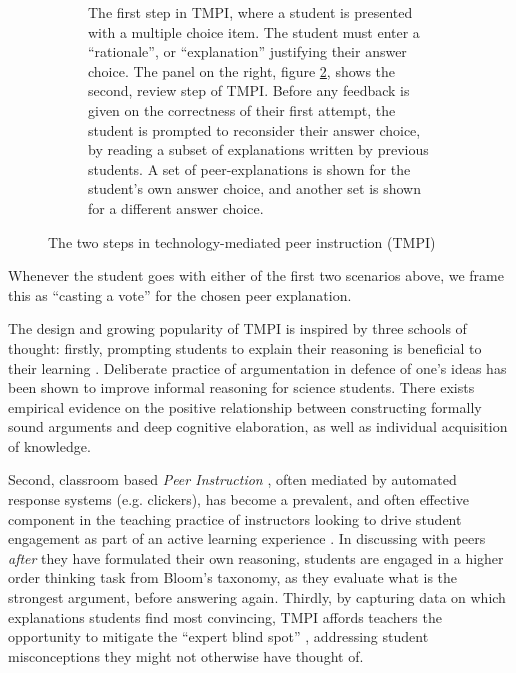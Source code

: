 \documentclass[notitlepage,12pt]{jedm}
\begin{document}
\begin{figure}[H]
	\begin{subfigure}[b]{0.4\textwidth}
		\def\svgscale{0.50}
		
		\caption{
			The first step in TMPI, where a student is presented with a 
			multiple choice item. The student must enter a ``rationale'', or 
			``explanation'' justifying their answer choice.
			\newline
			\newline
			The panel on the right, figure \protect\ref{fig:question_review}, 
			shows the second, review step of TMPI.
			Before any feedback is given on the correctness of their first 
			attempt, the student is prompted to reconsider their answer choice, 
			by reading a subset of explanations written by previous students.
			A set of peer-explanations is shown for the student's own answer 
			choice, and another set is shown for a different answer choice. 
		}
		\label{fig:question_start}
	\end{subfigure}
	\qquad
	\begin{subfigure}[b]{0.6\textwidth}
		\def\svgscale{0.50}
		
		\caption{}
		\label{fig:question_review}
	\end{subfigure}
	\caption{The two steps in technology-mediated peer 
		instruction (TMPI)}
	\label{fig:tmpi}
\end{figure}


Whenever the student goes with either of the first two scenarios above, we 
frame this as ``casting a vote'' for the chosen peer explanation.

The design and growing popularity of TMPI is inspired by three schools of 
thought: firstly, prompting students to explain their reasoning is beneficial 
to their learning \cite{chi_eliciting_1994}. 
Deliberate practice of argumentation in defence of one's ideas has been shown 
to improve informal reasoning for science students\cite{venville_impact_2010}.
There exists empirical evidence on the positive relationship between 
constructing formally sound arguments and deep cognitive elaboration, as well 
as individual acquisition of knowledge\cite{stegmann_collaborative_2012}.
 
Second, classroom based \textit{Peer Instruction} \cite{crouch_peer_2001}, 
often mediated by automated response systems (e.g. clickers), has become a 
prevalent, and often effective component in the teaching practice of 
instructors looking to drive student engagement as part of an active learning 
experience \cite{charles_beyond_2015}. 
In discussing with peers \textit{after} they have formulated their own 
reasoning, students are engaged in a higher order thinking task from Bloom's 
taxonomy, as they evaluate what is the strongest argument, before answering 
again.
Thirdly, by capturing data on which explanations students find most convincing, 
TMPI affords teachers the opportunity to mitigate the ``expert blind spot'' 
\cite{nathan_expert_2001}, addressing student misconceptions they might not 
otherwise have thought of.
\end{document}
